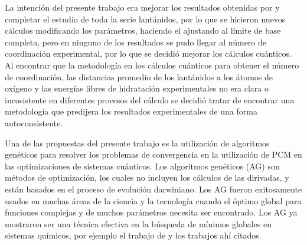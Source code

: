 La intenci\'on del presente trabajo era mejorar los resultados
obtenidas por \citep{Vill2009} y completar el estudio de toda la 
serie lant\'anidos, por lo que se hicieron nuevos c\'alculos 
modificando los par\'ametros, haciendo el ajustando al l\'imite de 
base completa, pero en ninguno de los resultados se pudo llegar al 
n\'umero de coordinaci\'on experimental, por lo que se decidi\'o 
mejorar los c\'alculos cu\'anticos. Al encontrar que la metodolog\'ia
en los c\'alculos cu\'anticos para obtener el n\'umero de 
coordinaci\'on, las distancias promedio de los lant\'anidos a los
\'atomos de ox\'igeno y las energ\'ias libres de hidrataci\'on 
experimentales no era clara o incosistente en diferentes procesos del
c\'alculo se decidi\'o tratar de encontrar una metodolog\'ia que 
predijera los resultados experimentales de una forma autoconsistente.

Una de las propuestas del presente trabajo es la utilizaci\'on de
algoritmos gen\'eticos para resolver los problemas de convergencia en
la utilizaci\'on de PCM en las optimizaciones de sistemas cu\'anticos.
Los algoritmos gen\'eticos (AG) son m\'etodos de optimizaci\'on, los 
cuales no incluyen los c\'alculos de las dirivadas, y est\'an basados
en el proceso de evoluci\'on darwiniano. Los AG fueron exitosamente
usados en muchas \'areas de la ciencia y la tecnolog\'ia cuando el 
\'optimo global para funciones complejas y de muchos par\'ametros 
necesita ser encontrado. Los AG ya mostraron ser una t\'ecnica 
efectiva en la b\'usqueda de m\'inimos globales en sistemas
qu\'imicos, por ejemplo el trabajo de \cite{Alex2005} y los trabajos
ah\'i citados.


